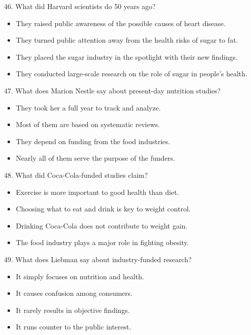 \documentclass[UTF8,11pt]{ctexart}
\begin{document}
46. What did Harvard scientists do 50 years ago?


\begin{itemize}[leftmargin=2em,itemsep=.2em,topsep=.4em]\item[A.] They raised public awareness of the possible causes of heart disease.
\item[B.] They turned public attention away from the health risks of sugar to fat.
\item[C.] They placed the sugar industry in the spotlight with their new findings.
\item[D.] They conducted large-scale research on the role of sugar in people's health.
\end{itemize}

47. What does Marion Nestle say about present-day nutrition studies?


\begin{itemize}[leftmargin=2em,itemsep=.2em,topsep=.4em]\item[A.] They took her a full year to track and analyze.
\item[B.] Most of them are based on systematic reviews.
\item[C.] They depend on funding from the food industries.
\item[D.] Nearly all of them serve the purpose of the funders.
\end{itemize}

48. What did Coca-Cola-funded studies claim?


\begin{itemize}[leftmargin=2em,itemsep=.2em,topsep=.4em]\item[A.] Exercise is more important to good health than diet.
\item[B.] Choosing what to eat and drink is key to weight control.
\item[C.] Drinking Coca-Cola does not contribute to weight gain.
\item[D.] The food industry plays a major role in fighting obesity.
\end{itemize}

49. What does Liebman say about industry-funded research?


\begin{itemize}[leftmargin=2em,itemsep=.2em,topsep=.4em]\item[A.] It simply focuses on nutrition and health.
\item[B.] It causes confusion among consumers.
\item[C.] It rarely results in objective findings.
\item[D.] It runs counter to the public interest.
\end{itemize}
\end{document}
